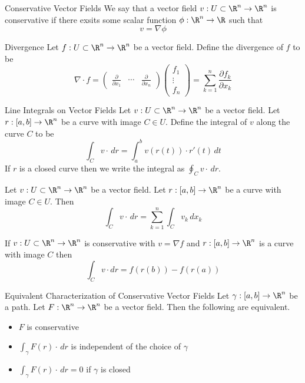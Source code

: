 \documentclass[a4paper]{article}
\begin{document}
\begin{defn}{Conservative Vector Fields}{} We say that a vector field $v:U\subset\R^n\to\R^n$ is conservative if there exsits some scalar function $\phi:\R^n\to\R$ such that $$v=\nabla\phi$$
\end{defn}

\begin{defn}{Divergence}{} Let $f:U\subset\R^n\to\R^n$ be a vector field. Define the divergence of $f$ to be $$\nabla\cdot f=\begin{pmatrix}\frac{\partial}{\partial x_1} & \cdots & \frac{\partial}{\partial x_n}\end{pmatrix}\begin{pmatrix}f_1\\\vdots\\f_n\end{pmatrix}=\sum_{k=1}^n\frac{\partial f_k}{\partial x_k}$$
\end{defn}

\begin{defn}{Line Integrals on Vector Fields}{} Let $v:U\subset\R^n\to\R^n$ be a vector field. Let $r:[a,b]\to\R^n$ be a curve with image $C\in U$. Define the integral of $v$ along the curve $C$ to be $$\int_Cv\cdot\,dr=\int_a^bv(r(t))\cdot r'(t)\,dt$$ If $r$ is a closed curve then we write the integral as $\oint_Cv\cdot\,dr$. 
\end{defn}

\begin{prp}{}{} Let $v:U\subset\R^n\to\R^n$ be a vector field. Let $r:[a,b]\to\R^n$ be a curve with image $C\in U$. Then $$\int_Cv\cdot\,dr=\sum_{k=1}^n\int_Cv_k\,dx_k$$
\end{prp}

\begin{prp}{}{} If $v:U\subset\R^n\to\R^n$ is conservative with $v=\nabla f$ and $r:[a,b]\to\R^n$ is a curve with image $C$ then $$\int_Cv\cdot dr=f(r(b))-f(r(a))$$
\end{prp}

\begin{thm}{Equivalent Characterization of Conservative Vector Fields}{} Let $\gamma:[a,b]\to\R^n$ be a path. Let $F:\R^n\to\R^n$ be a vector field. Then the following are equivalent. 
\begin{itemize}
\item $F$ is conservative
\item $\int_\gamma F(r)\cdot \,dr$ is independent of the choice of $\gamma$
\item $\int_\gamma F(r)\cdot \,dr=0$ if $\gamma$ is closed
\end{itemize}
\end{thm}
\end{document}
